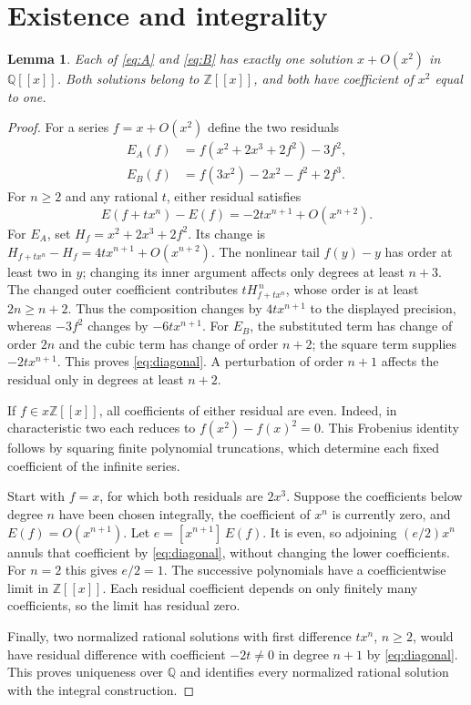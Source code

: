 \documentclass[11pt]{article}
\newtheorem{lemma}[theorem]{Lemma}
\newcommand{\Z}{\mathbb Z}
\newcommand{\Q}{\mathbb Q}
\newcommand{\coef}[2]{[x^{#1}]\,#2}
\begin{document}
\section{Existence and integrality}

\begin{lemma}\label{lem:integral}
Each of \eqref{eq:A} and \eqref{eq:B} has exactly one solution
$x+O(x^2)$ in $\Q[[x]]$. Both solutions belong to $\Z[[x]]$,
and both have coefficient of $x^2$ equal to one.
\end{lemma}
\begin{proof}
For a series $f=x+O(x^2)$ define the two residuals
\begin{align*}
 E_A(f)&=f(x^2+2x^3+2f^2)-3f^2,\\
 E_B(f)&=f(3x^2)-2x^2-f^2+2f^3.
\end{align*}
For $n\ge2$ and any rational $t$, either residual satisfies
\begin{equation}\label{eq:diagonal}
 E(f+tx^n)-E(f)=-2t x^{n+1}+O(x^{n+2}).
\end{equation}
For $E_A$, set $H_f=x^2+2x^3+2f^2$. Its change is
$H_{f+tx^n}-H_f=4t x^{n+1}+O(x^{n+2})$.
The nonlinear tail $f(y)-y$ has order at least two in $y$;
changing its inner argument affects only degrees at least $n+3$.
The changed outer coefficient contributes $tH_{f+tx^n}^{\,n}$,
whose order is at least $2n\ge n+2$.
Thus the composition changes by $4t x^{n+1}$ to the displayed precision,
whereas $-3f^2$ changes by $-6t x^{n+1}$.
For $E_B$, the substituted term has change of order $2n$ and the
cubic term has change of order $n+2$; the square term supplies
$-2t x^{n+1}$. This proves \eqref{eq:diagonal}. A perturbation
of order $n+1$ affects the residual only in degrees at least $n+2$.

If $f\in x\Z[[x]]$, all coefficients of either residual are even.
Indeed, in characteristic two each reduces to $f(x^2)-f(x)^2=0$.
This Frobenius identity follows by squaring finite polynomial truncations,
which determine each fixed coefficient of the infinite series.

Start with $f=x$, for which both residuals are $2x^3$.
Suppose the coefficients below degree $n$ have been chosen integrally,
the coefficient of $x^n$ is currently zero, and $E(f)=O(x^{n+1})$.
Let $e=\coef{n+1}{E(f)}$. It is even, so adjoining $(e/2)x^n$
annuls that coefficient by \eqref{eq:diagonal}, without changing
the lower coefficients. For $n=2$ this gives $e/2=1$.
The successive polynomials have a coefficientwise limit in $\Z[[x]]$.
Each residual coefficient depends on only finitely many coefficients,
so the limit has residual zero.

Finally, two normalized rational solutions with first difference
$t x^n$, $n\ge2$, would have residual difference with coefficient
$-2t\ne0$ in degree $n+1$ by \eqref{eq:diagonal}.
This proves uniqueness over $\Q$ and identifies every normalized rational
solution with the integral construction.
\end{proof}
\end{document}
